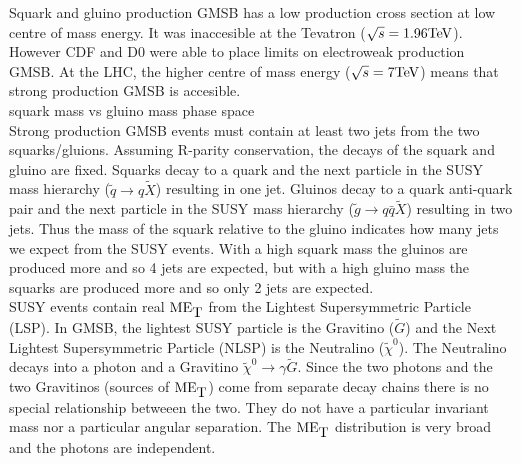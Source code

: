 Squark and gluino production GMSB has a low production cross section at low
centre of mass energy. It was inaccesible at the Tevatron ($\sqrt{s} = 
1.96\mbox{TeV}$). However CDF and D0 were able to place limits on electroweak 
production GMSB. At the LHC, the higher centre of mass energy ($\sqrt{s} = 
7\mbox{TeV}$) means that strong production GMSB is accesible. \\

squark mass vs gluino mass phase space \\ 

Strong production GMSB events must contain at least two jets from the two
squarks/gluions. Assuming R-parity conservation, the decays of the squark and
gluino are fixed. Squarks decay to a quark and the next particle in the SUSY mass
hierarchy ($\tilde{q}\rightarrow q\tilde{X}$) resulting in one jet. Gluinos decay 
to a quark anti-quark pair and the next particle in the SUSY mass hierarchy
($\tilde{g}\rightarrow q\bar{q}\tilde{X}$) resulting in two jets. Thus the mass
of the squark relative to the gluino indicates how many jets we expect from the
SUSY events. With a high squark mass the gluinos are produced more and so 4 jets
are expected, but with a high gluino mass the squarks are produced more and so
only 2 jets are expected. \\

SUSY events contain real $\mbox{ME}_{\mbox{T}}$ from the Lightest Supersymmetric Particle (LSP).
In GMSB, the lightest SUSY particle is the Gravitino ($\tilde{G}$) and the Next
Lightest Supersymmetric Particle (NLSP) is the Neutralino ($\tilde{\chi}^{0}$).
The Neutralino decays into a photon and a Gravitino $\tilde{\chi}^{0}\rightarrow
\gamma\tilde{G}$. Since the two photons and the two Gravitinos (sources of 
$\mbox{ME}_{\mbox{T}}$) come from separate decay chains there is no special relationship
betweeen the two. They do not have a particular invariant mass nor a particular
angular separation. The $\mbox{ME}_{\mbox{T}}$ distribution is very broad and the photons are
independent.

